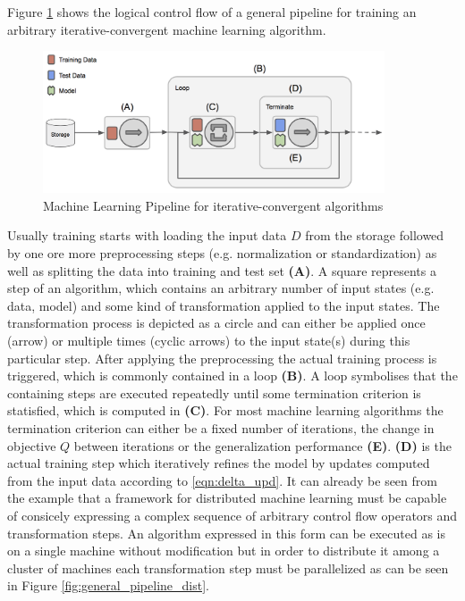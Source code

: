 Figure \ref{fig:general_pipeline} shows the logical control flow of a general pipeline for training an arbitrary iterative-convergent machine learning algorithm.
\begin{figure}[ht]
\centering
\includegraphics[width=0.9\textwidth]{img/general_pipeline.png}
\caption{Machine Learning Pipeline for iterative-convergent algorithms}
\label{fig:general_pipeline}
\end{figure}
Usually training starts with loading the input data $D$ from the storage followed by one ore more preprocessing steps (e.g. normalization or standardization) as well as splitting the data into training and test set \textbf{(A)}.
A square represents a step of an algorithm, which contains an arbitrary number of input states (e.g. data, model) and some kind of transformation applied to the input states.
The transformation process is depicted as a circle and can either be applied once (arrow) or multiple times (cyclic arrows) to the input state(s) during this particular step.
After applying the preprocessing the actual training process is triggered, which is commonly contained in a loop \textbf{(B)}.
A loop symbolises that the containing steps are executed repeatedly until some termination criterion is statisfied, which is computed in \textbf{(C)}.
For most machine learning algorithms the termination criterion can either be a fixed number of iterations, the change in objective $Q$ between iterations or the generalization performance \textbf{(E)}.
\textbf{(D)} is the actual training step which iteratively refines the model by updates computed from the input data according to \ref{eqn:delta_upd}.
It can already be seen from the example that a framework for distributed machine learning must be capable of consicely expressing a complex sequence of arbitrary control flow operators and transformation steps.
An algorithm expressed in this form can be executed as is on a single machine without modification but in order to distribute it among a cluster of machines each transformation step must be parallelized as can be seen in Figure \ref{fig:general_pipeline_dist}.
